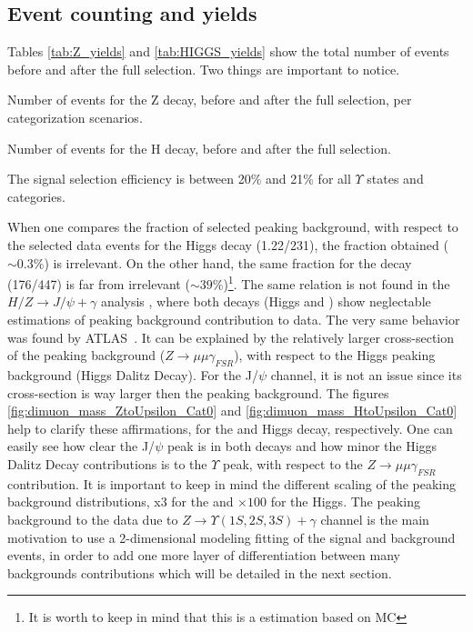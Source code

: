 \subsection{Event counting and yields}
\label{sec:yeilds}

Tables \ref{tab:Z_yields} and \ref{tab:HIGGS_yields} show the total number of events before and after the full selection. Two things are important to notice.

\begin{table}[ht]
\begin{center}

\caption{Number of events for the Z decay, before and after the full selection, per categorization scenarios.}
\label{tab:Z_yields}
\end{center}
\end{table}


\begin{table}[ht]
\begin{center}

\caption{Number of events for the H decay, before and after the full selection.}
\label{tab:HIGGS_yields}
\end{center}
\end{table}


The signal selection efficiency is between 20\% and 21\% for all $\Upsilon$ states and categories. 

When one compares the fraction of selected peaking background, with respect to the selected data events for the Higgs decay (1.22/231), the fraction obtained ($\sim0.3\%$) is irrelevant. On the other hand, the same fraction for the \Z decay (176/447) is far from irrelevant ($\sim39\%$)\footnote{It is worth to keep in mind that this is a estimation based on MC}. The same relation is not found in the $H/Z \rightarrow J/\psi + \gamma$ analysis \cite{papper_jpsi}, where both decays (Higgs and \Z) show neglectable estimations of peaking background contribution to data. 
The very same behavior was found by ATLAS~\cite{atlas_paper:PhysRevLett.114.121801}. It can be explained by the relatively larger cross-section of the \Z peaking background ($Z \rightarrow \mu\mu\gamma_{FSR}$), with respect to the Higgs peaking background (Higgs Dalitz Decay). For the J/$\psi$ channel, it is not an issue since its  cross-section is way larger then the peaking background. The figures \ref{fig:dimuon_mass_ZtoUpsilon_Cat0} and \ref{fig:dimuon_mass_HtoUpsilon_Cat0} help to clarify these affirmations, for the \Z and Higgs decay, respectively. 
One can easily see how clear the J/$\psi$ peak is in both decays and how minor the Higgs Dalitz Decay contributions is to the $\Upsilon$ peak, with respect to the $Z \rightarrow \mu\mu\gamma_{FSR}$ contribution. It is important to keep in mind the different scaling of the peaking background distributions, x3 for the \Z and $\times 100$ for the Higgs.
The peaking background to the data due to $Z \rightarrow \Upsilon(1S,2S,3S) + \gamma$ channel  is the main motivation to use a 2-dimensional modeling fitting of the signal and background events, in order to add one more layer of differentiation between many backgrounds contributions which will be detailed in the next section.


